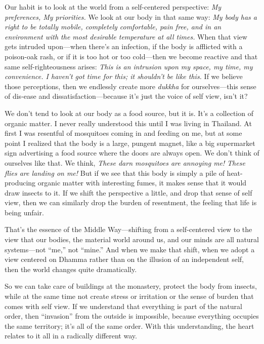 Our habit is to look at the world from a self-centered perspective: 
\emph{My preferences, My priorities.} We look at our body in that same 
way: \emph{My body has a right to be totally mobile, completely 
comfortable, pain free, and in an environment with the most desirable 
temperature at all times.} When that view gets intruded upon---when 
there's an infection, if the body is afflicted with a poison-oak rash, 
or if it is too hot or too cold---then we become reactive and that same 
self-righteousness arises: \emph{This is an intrusion upon my space, my 
time, my convenience. I haven't got time for this; it shouldn't be like 
this.} If we believe those perceptions, then we endlessly create more 
\emph{dukkha} for ourselves---this sense of dis-ease and 
dissatisfaction---because it's just the voice of self view, isn't it?

We don't tend to look at our body as a food source, but it is. It's a 
collection of organic matter. I never really understood this until I 
was living in Thailand. At first I was resentful of mosquitoes coming 
in and feeding on me, but at some point I realized that the body is a 
large, pungent magnet, like a big supermarket sign advertising a food 
source where the doors are always open. We don't think of ourselves 
like that. We think, \emph{These darn mosquitoes are annoying me!} 
\emph{These flies are landing on me!} But if we see that this body is 
simply a pile of heat-producing organic matter with interesting fumes, 
it makes sense that it would draw insects to it. If we shift the 
perspective a little, and drop that sense of self view, then we can 
similarly drop the burden of resentment, the feeling that life is being 
unfair.

That's the essence of the Middle Way---shifting from a self-centered 
view to the view that our bodies, the material world around us, and our 
minds are all natural systems---not ``me,'' not ``mine.'' And when we 
make that shift, when we adopt a view centered on Dhamma rather than on 
the illusion of an independent self, then the world changes quite 
dramatically.

So we can take care of buildings at the monastery, protect the body 
from insects, while at the same time not create stress or irritation or 
the sense of burden that comes with self view. If we understand that 
everything is part of the natural order, then ``invasion'' from the 
outside is impossible, because everything occupies the same territory; 
it's all of the same order. With this understanding, the heart relates 
to it all in a radically different way.

